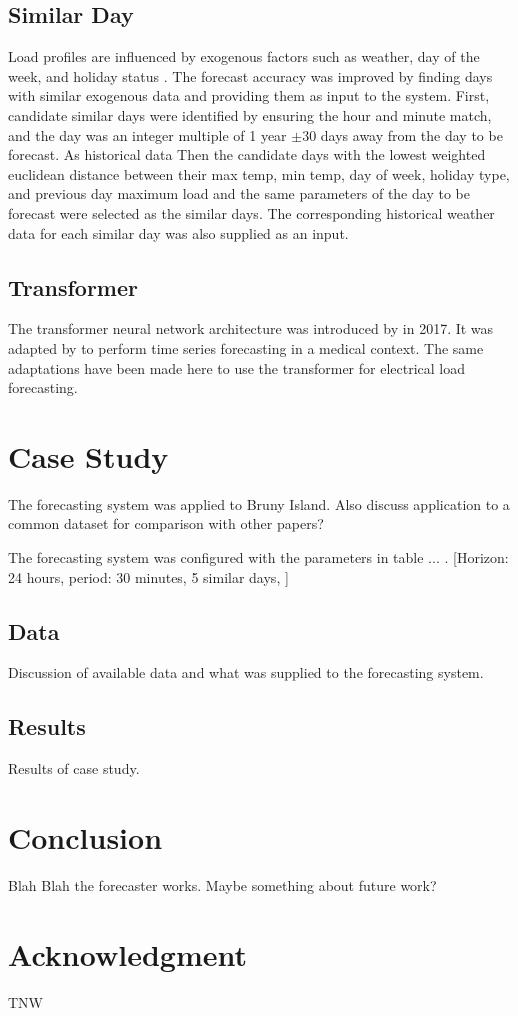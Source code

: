\documentclass[conference]{IEEEtran}
\begin{document}
\subsection{Similar Day}
Load profiles are influenced by exogenous factors such as weather, day of the week, and holiday status \cite{Weron2006}.
The forecast accuracy was improved by finding days with similar exogenous data and providing them as input to the system.
First, candidate similar days were identified by ensuring the hour and minute match, and the day was an integer multiple of 1 year $\pm$30 days away from the day to be forecast. As historical data 
Then the candidate days with the lowest weighted euclidean distance between their max temp, min temp, day of week, holiday type, and previous day maximum load and the same parameters of the day to be forecast were selected as the similar days.
The corresponding historical weather data for each similar day was also supplied as an input.

\subsection{Transformer}
The transformer neural network architecture was introduced by \cite{Vaswani2017} in 2017. 
It was adapted by \cite{Song2017} to perform time series forecasting in a medical context.
The same adaptations have been made here to use the transformer for electrical load forecasting.

\section{Case Study}
The forecasting system was applied to Bruny Island.
Also discuss application to a common dataset for comparison with other papers?

The forecasting system was configured with the parameters in table ... .
[Horizon: 24 hours, period: 30 minutes, 5 similar days, ]

\subsection{Data}
Discussion of available data and what was supplied to the forecasting system.

\subsection{Results}
Results of case study.

\section{Conclusion}
Blah Blah the forecaster works.
Maybe something about future work?


\section*{Acknowledgment}
TNW




\end{document}
